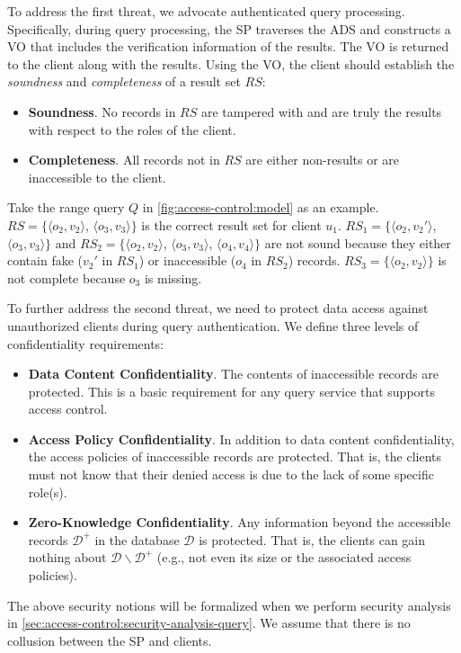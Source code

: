 To address the first threat, we advocate authenticated query processing. Specifically, during query processing, the SP traverses the ADS and constructs a VO that includes the verification information of the results. The VO is returned to the client along with the results. Using the VO, the client should establish the \emph{soundness} and \emph{completeness} of a result set $RS$:
\begin{itemize}
  \item \textbf{Soundness}. No records in $RS$ are tampered with and are truly the results with respect to the roles of the client.
  \item \textbf{Completeness}. All records not in $RS$ are either non-results or are inaccessible to the client.
\end{itemize}
Take the range query $Q$ in \cref{fig:access-control:model} as an example. $RS=\{\langle o_2, v_2\rangle$, $\langle o_3, v_3\rangle\}$ is the correct result set for client $u_1$. $RS_1 = \{\langle o_2, v_2'\rangle$, $\langle o_3, v_3\rangle\}$ and $RS_2 = \{\langle o_2, v_2\rangle$, $\langle o_3, v_3\rangle$, $\langle o_4, v_4\rangle\}$ are not sound because they either contain fake ($v_2'$ in $RS_1$) or inaccessible ($o_4$ in $RS_2$) records. $RS_3 = \{\langle o_2, v_2\rangle\}$ is not complete because $o_3$ is missing.

To further address the second threat, we need to protect data access against unauthorized clients during query authentication. We define three levels of confidentiality requirements:
\begin{itemize}
  \item \textbf{Data Content Confidentiality}. The contents of inaccessible records are protected. This is a basic requirement for any query service that supports access control.
  \item \textbf{Access Policy Confidentiality}. In addition to data content confidentiality, the access policies of inaccessible records are protected. That is, the clients must not know that their denied access is due to the lack of some specific role(s). %
  \item \textbf{Zero-Knowledge Confidentiality}.
    Any information beyond the accessible records $\mathcal{D}^+$ in the database $\mathcal{D}$ is protected. That is, the clients can gain nothing about $\mathcal{D}\backslash\mathcal{D}^+$ (e.g., not even its size or the associated access policies).
\end{itemize}
The above security notions will be formalized when we perform security analysis in \cref{sec:access-control:security-analysis-query}. We assume that there is no collusion between the SP and clients.

